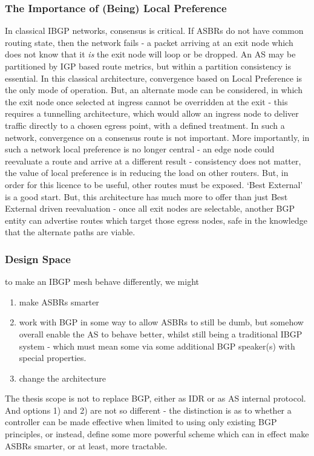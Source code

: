 \subsubsection{The Importance of (Being) Local Preference}
In classical IBGP networks, consensus is critical.  If ASBRs do not have common
routing state, then the network fails - a packet arriving at an exit node which
does not know that it \textit{is} the exit node will loop or be dropped.  An AS may be
partitioned by IGP based route metrics, but within a partition consistency is
essential.
In this classical architecture, convergence based on Local Preference is the
only mode of operation.
But, an alternate mode can be considered, in which the exit
node once selected at ingress cannot be overridden at the exit - this requires
a tunnelling architecture, which would allow an ingress node to deliver traffic
directly to a chosen egress point, with a defined treatment.
In such a network, convergence on a consensus route is not important.
More importantly, in such a network local preference is no longer central - an
edge node could reevaluate a route and arrive at a different result -
consistency does not matter, the value of local preference is in reducing the
load on other routers.	But, in order for this licence to be useful, other
routes must be exposed.  `Best External' is a good start.
But, this architecture has much more to offer than just Best External driven
reevaluation - once all exit nodes are selectable, another BGP entity can
advertise routes which target those egress nodes, safe in the knowledge that
the alternate paths are viable.

\subsubsection{Design Space}
to make an IBGP mesh behave differently, we might
\begin{enumerate}
	\item  make ASBRs smarter
	\item  work with BGP in some way to allow ASBRs to still be dumb, but somehow overall enable the AS to behave better, whilst still being a traditional IBGP system - which must mean some via some additional BGP speaker(s) with special properties.
	\item  change the architecture
\end{enumerate}

The thesis scope is not to replace BGP, either as IDR or as AS internal
protocol.
And options 1) and 2) are not so different - the distinction is as to whether a
controller can be made effective when limited to using only existing BGP
principles, or instead, define some more powerful scheme which can in effect
make ASBRs smarter, or at least, more tractable.

